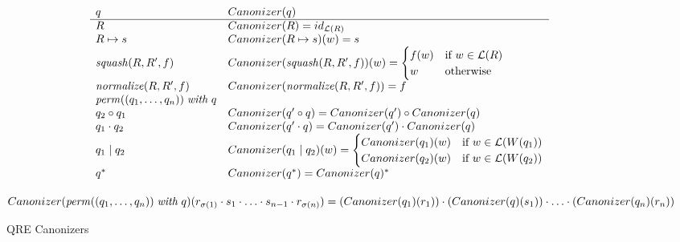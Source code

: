 \documentclass{svproc}
\newcommand{\squash}[3]{\ensuremath{\mathit{squash}(#1, #2, #3)}}
\newcommand{\perm}[2]{\ensuremath{\mathit{perm}(#1)\; \mathit{with}\; #2}}
\newcommand{\normalize}[3]{\ensuremath{\mathit{normalize}(#1, #2, #3)}}
\newcommand{\sep}{\ensuremath{\; | \;}}
\begin{document}
\begin{figure}[t]
  \begin{center}
\[
    \begin{array}{l@{\quad}l} 
      q & Canonizer(q)  \\ \hline
      R & Canonizer(R) = id_{\mathcal{L}(R)} \\
      R \mapsto s & Canonizer(R \mapsto s)(w) = s\\
      \squash{R}{R'}{f} & Canonizer(\squash{R}{R'}{f})(w) = 
\begin{cases}
f(w) & \text{if } w \in \mathcal{L}(R)\\
w & \text{otherwise}
\end{cases}\\
      \normalize{R}{R'}{f} & Canonizer(\normalize{R}{R'}{f}) = f\\
      \perm{(q_1, \ldots, q_n)}{q} & \\
      q_2 \circ  q_1 & Canonizer(q' \circ q) = Canonizer(q') \circ Canonizer(q)\\
      q_1 \cdot q_2 & Canonizer(q' \cdot q) = Canonizer(q') \cdot Canonizer(q)\\
      q_1 \sep q_2 &  Canonizer(q_1 \sep q_2)(w) = 
\begin{cases}
Canonizer(q_1)(w) & \text{if } w \in \mathcal{L}(W(q_1))\\
Canonizer(q_2)(w) & \text{if } w \in \mathcal{L}(W(q_2))\\
\end{cases}\\
      q^* &  Canonizer(q^*) = Canonizer(q)^* \\
    \end{array}
    \]
    \end{center}
    $Canonizer(\perm{(q_1, \ldots, q_n)}{q})(r_{\sigma(1)}
\cdot s_1 \cdot \ldots \cdot s_{n-1} \cdot r_{\sigma(n)}) \newline
= (Canonizer(q_1)(r_1)) \cdot (Canonizer(q)(s_1)) \cdot \ldots \cdot
(Canonizer(q_n)(r_n))$
  \caption{QRE Canonizers}
  \label{fig:canonizers}
\end{figure}
\end{document}
